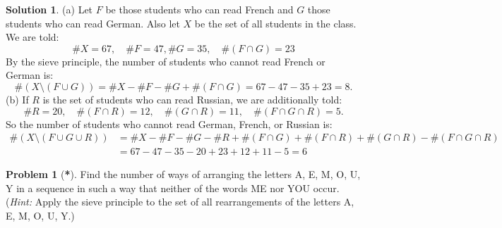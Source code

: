 \documentclass[12pt,a4paper]{article}
\numberwithin{equation}{section}
\theoremstyle{plain}
\theoremstyle{definition}
\newtheorem{problem}{Problem}
\theoremstyle{solutionstyle}
\newtheorem*{solution*}{Solution} %
\theoremstyle{definition} %
\begin{document}
	\begin{solution*}
		(a) Let $F$ be those students who can read French and $G$ those students who can read German. Also let $X$ be the set of all students in the class. We are told: \[
		\#X = 67, \quad \#F = 47, \#G = 35, \quad \#(F \cap G) = 23
		\]
		By the sieve principle, the number of students who cannot read French or German is:
		\[
		\#(X \setminus(F \cup G)) = \#X - \#F - \#G + \#(F \cap G) = 67 - 47 - 35 + 23 = \boxed{8}.
		\]
		(b) If $R$ is the set of students who can read Russian, we are additionally told: 
		\[
		\#R = 20, \quad \#(F \cap R) = 12, \quad \#(G \cap R) = 11, \quad \#(F \cap G \cap R) = 5.
		\]
		So the number of students who cannot read German, French, or Russian is:
		\begin{align*}
			\#(X \setminus(F \cup G \cup R)) &= \#X - \#F - \#G - \#R + \#(F \cap G) + \#(F \cap R) + \#(G \cap R) - \#(F \cap G \cap R) \\
			&= 67 - 47 - 35 - 20 + 23 + 12 + 11 - 5 = \boxed{6}
		\end{align*}
	\end{solution*}
	
	\begin{problem}[\textbf{*}]
		Find the number of ways of arranging the letters A, E, M, O, U, Y in a sequence in such a way that neither of the words ME nor YOU occur. (\emph{Hint:} Apply the sieve principle to the set of all rearrangements of the letters A, E, M, O, U, Y.)
	\end{problem}
	
\end{document}
